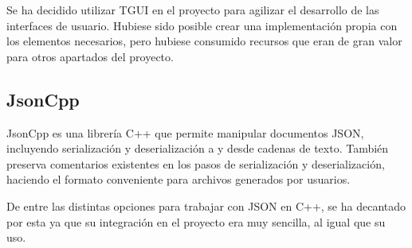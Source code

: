 		Se ha decidido utilizar TGUI en el proyecto para agilizar el desarrollo de las interfaces de usuario. Hubiese sido posible crear una implementación propia con los elementos necesarios, pero hubiese consumido recursos que eran de gran valor para otros apartados del proyecto.

	\subsection{JsonCpp}

		JsonCpp es una librería C++ que permite manipular documentos JSON, incluyendo serialización y deserialización a y desde cadenas de texto. También preserva comentarios existentes en los pasos de serialización y deserialización, haciendo el formato conveniente para archivos generados por usuarios.

		De entre las distintas opciones para trabajar con JSON en C++, se ha decantado por esta ya que su integración en el proyecto era muy sencilla, al igual que su uso.
